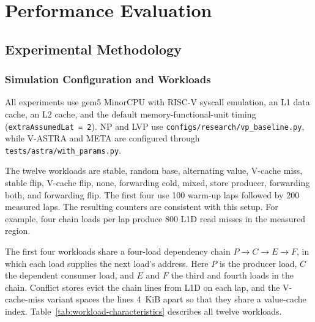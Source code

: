 \section{Performance Evaluation}
\label{sec:performance-evaluation}


\subsection{Experimental Methodology}
\label{subsec:performance-methodology}

\subsubsection{Simulation Configuration and Workloads}

All experiments use gem5 MinorCPU with RISC-V syscall emulation,
an L1 data cache, an L2 cache, and the default memory-functional-unit
timing (\texttt{extraAssumedLat = 2}). NP and LVP use
\texttt{configs/research/vp\_baseline.py}, while V-ASTRA and META
are configured through \texttt{tests/astra/with\_params.py}.

The twelve workloads are stable, random base, alternating value,
V-cache miss, stable flip, V-cache flip, none, forwarding cold, mixed,
store producer, forwarding both, and forwarding flip. The first four use 100 warm-up
laps followed by 200 measured laps. The resulting counters are
consistent with this setup. For example, four chain loads per lap
produce 800 L1D read misses in the measured region.

The first four workloads share a four-load dependency chain
$P\rightarrow C\rightarrow E\rightarrow F$, in which each load supplies
the next load's address. Here $P$ is the producer load, $C$ the
dependent consumer load, and $E$ and $F$ the third and fourth loads in
the chain. Conflict stores evict the chain lines from L1D
on each lap, and the V-cache-miss variant spaces the lines 4~KiB apart
so that they share a value-cache index.
Table~\ref{tab:workload-characteristics} describes all twelve workloads.

